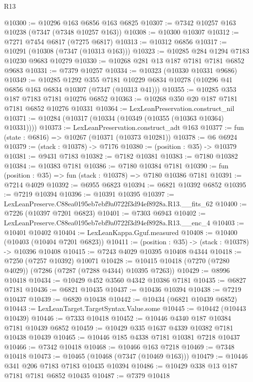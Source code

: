\begin{lexlean}{R13}
\begin{coremodule}
@10300 := @10296 @163 @6856 @163 @6825
@10307 := @7342 @10257 @163 @10238 (@7347 (@7348 @10257 @163))
@10308 := @10300 @10307
@10312 := @7271 @7454 @6817 (@7275 @6817)
@10313 := @10312 @6856
@10317 := @10291 (@10308 (@7347 (@10313 @163)))
@10323 := @10285 @284 @1294 @7183 @10230 @9683 @10279
@10330 := @10268 @281 @13 @187 @7181 @7181 @6852 @9683
@10331 := @7379 @10257
@10334 := @10323 (@10330 @10331 @9686)
@10349 := @10285
    @1292
    @355
    @7181
    @10229
    @6834
    @10278
    (@10296 @41 @6856 @163 @6834 @10307 (@7347 (@10313 @41)))
@10355 := @10285 @353 @187 @7183 @7181 @10276 @6852
@10363 := @10268 @350 @20 @187 @7181 @7181 @6852 @10276 @10331
@10364 := LexLeanPreservation.construct_nil
@10371 := @10284 (@10317 (@10334 (@10349 (@10355 (@10363 @10364) @10331))))
@10373 := LexLeanPreservation.construct_adt @163
@10377 := fun (state : @6816) => @10267 (@10371 (@10373 @10281))
@10378 := @6 @6924
@10379 := (stack : @10378) -> @7176
@10380 := (position : @35) -> @10379
@10381 := @9431 @7183
@10382 := @7182 @10381
@10383 := @7180 @10382
@10384 := @10383 @7181
@10386 := @7180 @10384 @7181
@10390 := fun (position : @35) => fun (stack : @10378) => @7180 @10386 @7181
@10391 := @7214 @4029
@10392 := @6955 @6823
@10394 := @6821 @10392 @6852
@10395 := @7219 @10394
@10396 := @10391 @10395
@10397 := LexLeanPreserve.C88ea0195eb7ebf9a0722f3d94ef8928a.R13.__fits_62
@10400 := @7226 (@10397 @7201 @6823)
@10401 := @7303 @6943
@10402 := LexLeanPreserve.C88ea0195eb7ebf9a0722f3d94ef8928a.R13.__enc_4
@10403 := @10401 @10402
@10404 := LexLeanKappa.Gguf.measured
@10408 := @10400 (@10403 (@10404 @7201 @6823))
@10411 := (position : @35) -> (stack : @10378) -> @10396 @10408
@10415 := @7243 @4029 @10395 @10408 @4344
@10418 := @7250 (@7257 @10392) @10071
@10428 := @10415 @10418 (@7270 (@7280 @4029)) (@7286 (@7287 (@7288 @4344) @10395 @7263))
@10429 := @8996 @10418
@10434 := @10429 @452 @3560 @4342 @10386 @7181
@10435 := @6827 @7181
@10436 := @6821 @10435
@10437 := @10436 @10394
@10438 := @7219 @10437
@10439 := @6820 @10438
@10442 := @10434 (@6821 @10439 @6852)
@10443 := LexLeanTarget.TargetSyntax.Value.some
@10445 := @10442 (@10443 @10439)
@10446 := @7333 @10418
@10452 := @10446 @4340 @187 @10384 @7181 @10439 @6852
@10459 := @10429 @335 @1637 @4339 @10382 @7181 @10438 @10439
@10465 := @10446 @185 @4338 @7181 @10381 @7218 @10437
@10466 := @7342 @10418
@10468 := @10466 @163 @7218
@10469 := @7348 @10418
@10473 := @10465 (@10468 (@7347 (@10469 @163)))
@10479 := @10446 @341 @206 @7183 @7183 @10435 @10394
@10486 := @10429 @338 @13 @187 @7181 @7181 @6852 @10435
@10487 := @7379 @10418

\end{coremodule}
\end{lexlean}
